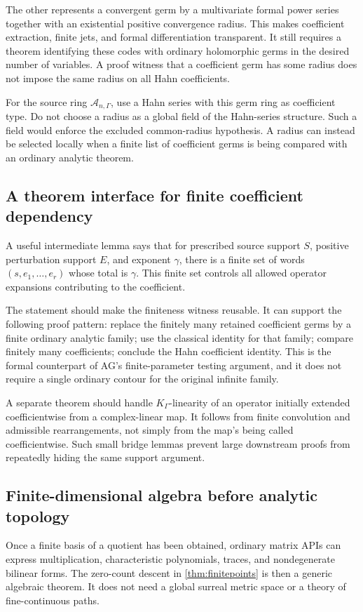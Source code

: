 \documentclass[11pt,letterpaper]{article}
\theoremstyle{definition}
\theoremstyle{remark}
\newcommand{\A}{\mathscr A}
\numberwithin{equation}{section}
\begin{document}
The other represents a convergent germ by a multivariate formal power series together with an existential positive convergence radius. This makes coefficient extraction, finite jets, and formal differentiation transparent. It still requires a theorem identifying these codes with ordinary holomorphic germs in the desired number of variables. A proof witness that a coefficient germ has some radius does not impose the same radius on all Hahn coefficients.

For the source ring \(\A_{n,\Gamma}\), use a Hahn series with this germ ring as coefficient type. Do not choose a radius as a global field of the Hahn-series structure. Such a field would enforce the excluded common-radius hypothesis. A radius can instead be selected locally when a finite list of coefficient germs is being compared with an ordinary analytic theorem.

\subsection{A theorem interface for finite coefficient dependency}
A useful intermediate lemma says that for prescribed source support \(S\), positive perturbation support \(E\), and exponent \(\gamma\), there is a finite set of words \((s,e_1,\ldots,e_r)\) whose total is \(\gamma\). This finite set controls all allowed operator expansions contributing to the coefficient.

The statement should make the finiteness witness reusable. It can support the following proof pattern: replace the finitely many retained coefficient germs by a finite ordinary analytic family; use the classical identity for that family; compare finitely many coefficients; conclude the Hahn coefficient identity. This is the formal counterpart of AG's finite-parameter testing argument, and it does not require a single ordinary contour for the original infinite family.

A separate theorem should handle \(K_\Gamma\)-linearity of an operator initially extended coefficientwise from a complex-linear map. It follows from finite convolution and admissible rearrangements, not simply from the map's being called coefficientwise. Such small bridge lemmas prevent large downstream proofs from repeatedly hiding the same support argument.

\subsection{Finite-dimensional algebra before analytic topology}
Once a finite basis of a quotient has been obtained, ordinary matrix APIs can express multiplication, characteristic polynomials, traces, and nondegenerate bilinear forms. The zero-count descent in \cref{thm:finitepoints} is then a generic algebraic theorem. It does not need a global surreal metric space or a theory of fine-continuous paths.
\end{document}
